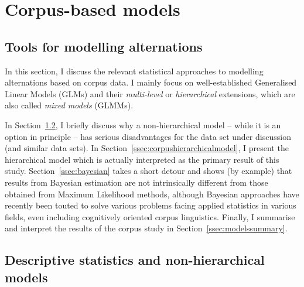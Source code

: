 \documentclass[USenglish]{article}
\begin{document}


\section{Corpus-based models}
\label{sec:corpusmodels}

\subsection{Tools for modelling alternations}
\label{sec:righttools}

In this section, I discuss the relevant statistical approaches to modelling alternations based on corpus data.
I mainly focus on well-established Generalised Linear Models (GLMs) and their \textit{multi-level} or \textit{hierarchical} extensions, which are also called \textit{mixed models} (GLMMs).


In Section~\ref{ssec:corpusnonhierarchicalmodel}, I briefly discuss why a non-hierarchical model -- while it is an option in principle -- has serious disadvantages for the data set under discussion (and similar data sets).
In Section~\ref{ssec:corpushierarchicalmodel}, I present the hierarchical model which is actually interpreted as the primary result of this study.
Section~\ref{ssec:bayesian} takes a short detour and shows (by example) that results from Bayesian estimation are not intrinsically different from those obtained from Maximum Likelihood methods, although Bayesian approaches have recently been touted to solve various problems facing applied statistics in various fields, even including cognitively oriented corpus linguistics.
Finally, I summarise and interpret the results of the corpus study in Section~\ref{ssec:modelssummary}.



\subsection{Descriptive statistics and non-hierarchical models}
\label{ssec:corpusnonhierarchicalmodel}



\end{document}
